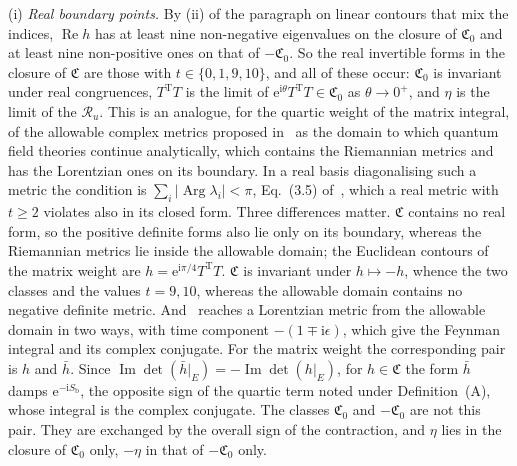 (i) \emph{Real boundary points.} By (ii) of the paragraph on linear contours that mix the indices, \(\operatorname{Re}h\) has at least nine non-negative eigenvalues on the closure of \(\mathfrak C_0\) and at least nine non-positive ones on that of \(-\mathfrak C_0\). So the real invertible forms in the closure of \(\mathfrak C\) are those with \(t\in\{0,1,9,10\}\), and all of these occur: \(\mathfrak C_0\) is invariant under real congruences, \(T^{\mathrm T}T\) is the limit of \(\mathrm e^{\mathrm i\theta}T^{\mathrm T}T\in\mathfrak C_0\) as \(\theta\to0^+\), and \(\eta\) is the limit of the \(\mathcal R_u\). This is an analogue, for the quartic weight of the matrix integral, of the allowable complex metrics proposed in~\cite{KontsevichSegal2021} as the domain to which quantum field theories continue analytically, which contains the Riemannian metrics and has the Lorentzian ones on its boundary. In a real basis diagonalising such a metric the condition is \(\sum_i|\operatorname{Arg}\lambda_i|<\pi\), Eq.~(3.5) of~\cite{Witten2021ComplexMetrics}, which a real metric with \(t\ge2\) violates also in its closed form. Three differences matter. \(\mathfrak C\) contains no real form, so the positive definite forms also lie only on its boundary, whereas the Riemannian metrics lie inside the allowable domain; the Euclidean contours of the matrix weight are \(h=\mathrm e^{\mathrm i\pi/4}T^{\mathrm T}T\). \(\mathfrak C\) is invariant under \(h\mapsto-h\), whence the two classes and the values \(t=9,10\), whereas the allowable domain contains no negative definite metric. And~\cite{Witten2021ComplexMetrics} reaches a Lorentzian metric from the allowable domain in two ways, with time component \(-(1\mp\mathrm i\epsilon)\), which give the Feynman integral and its complex conjugate. For the matrix weight the corresponding pair is \(h\) and \(\bar h\). Since \(\operatorname{Im}\det(\bar h|_E)=-\operatorname{Im}\det(h|_E)\), for \(h\in\mathfrak C\) the form \(\bar h\) damps \(\mathrm e^{-\mathrm iS_{\mathrm b}}\), the opposite sign of the quartic term noted under Definition~(A), whose integral is the complex conjugate. The classes \(\mathfrak C_0\) and \(-\mathfrak C_0\) are not this pair. They are exchanged by the overall sign of the contraction, and \(\eta\) lies in the closure of \(\mathfrak C_0\) only, \(-\eta\) in that of \(-\mathfrak C_0\) only.

